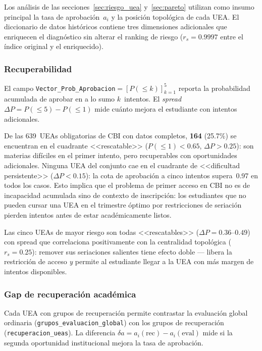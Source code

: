 \documentclass[11pt,letterpaper]{article}
\begin{document}
Los análisis de las secciones~\ref{sec:riesgo_uea} y~\ref{sec:pareto} utilizan
como insumo principal la tasa de aprobación~$a_i$ y la posición topológica de
cada UEA.
El diccionario de datos históricos contiene tres dimensiones adicionales que
enriquecen el diagnóstico sin alterar el ranking de riesgo
($r_s=0.9997$ entre el índice original y el enriquecido).

\subsubsection{Recuperabilidad}

El campo \texttt{Vector\_Prob\_Aprobacion}$=[P(\leq k)]_{k=1}^{5}$ reporta la
probabilidad acumulada de aprobar en a lo sumo $k$~intentos.
El \emph{spread} $\Delta P = P(\leq 5)-P(\leq 1)$ mide cuánto mejora el
estudiante con intentos adicionales.

De las 639~UEAs obligatorias de CBI con datos completos, \textbf{164}
(25.7\%) se encuentran en el cuadrante <<rescatable>> ($P(\leq1)<0.65$,
$\Delta P > 0.25$): son materias difíciles en el primer intento, pero
recuperables con oportunidades adicionales.
Ninguna UEA del conjunto cae en el cuadrante de <<dificultad persistente>>
($\Delta P < 0.15$): la cota de aprobación a cinco intentos supera~0.97 en
todos los casos.
Esto implica que el problema de primer acceso en CBI no es de incapacidad
acumulada sino de contexto de inscripción: los estudiantes que no pueden
cursar una UEA en el trimestre óptimo por restricciones de seriación
pierden intentos antes de estar académicamente listos.

Las cinco UEAs de mayor riesgo son todas <<rescatables>>
($\Delta P = 0.36$--$0.49$) con spread que correlaciona positivamente con
la centralidad topológica ($r_s = 0.25$): remover sus seriaciones salientes
tiene efecto doble --- libera la restricción de acceso \emph{y} permite al
estudiante llegar a la UEA con más margen de intentos disponibles.

\subsubsection{Gap de recuperación académica}

Cada UEA con grupos de recuperación permite contrastar la evaluación
global ordinaria (\texttt{grupos\_eva\-lua\-cion\_glo\-bal}) con los
grupos de recuperación (\texttt{recu\-pe\-ra\-cion\_ueas}).
La diferencia $\delta a = a_i(\text{rec})-a_i(\text{eval})$ mide si la
segunda oportunidad institucional mejora la tasa de aprobación.
\end{document}
